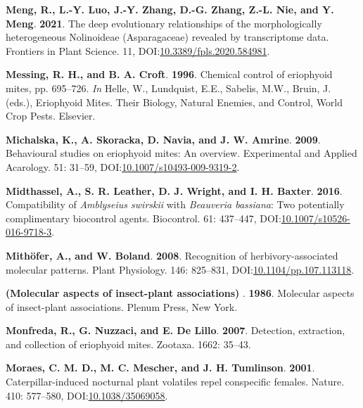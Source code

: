 \documentclass[12pt,final,CPage]{ufthesis}
\newlength{\cslhangindent}
\newenvironment{CSLReferences}[2] %
{%
	\setlength{\parindent}{0pt}
	\ifodd #1 \everypar{\setlength{\hangindent}{\cslhangindent}}\ignorespaces\fi
	\ifnum #2 > 0
	\setlength{\parskip}{#2\baselineskip}
	\fi
}%
{}
\begin{document}
{\begin{CSLReferences}{1}{0}
  \leavevmode{}%
  \textbf{Meng, R., L.-Y. Luo, J.-Y. Zhang, D.-G. Zhang, Z.-L. Nie, and Y. Meng}. \textbf{2021}. The deep evolutionary relationships of the morphologically heterogeneous {Nolinoideae} ({Asparagaceae}) revealed by transcriptome data. Frontiers in Plant Science. 11, DOI:\href{https://doi.org/10.3389/fpls.2020.584981}{10.3389/fpls.2020.584981}.

  \leavevmode{}%
  \textbf{Messing, R. H., and B. A. Croft}. \textbf{1996}. Chemical control of eriophyoid mites, pp. 695--726. \emph{In} Helle, W., Lundquist, E.E., Sabelis, M.W., Bruin, J. (eds.), Eriophyoid Mites. Their Biology, Natural Enemies, and Control, World Crop Pests. Elsevier.

  \leavevmode{}%
  \textbf{Michalska, K., A. Skoracka, D. Navia, and J. W. Amrine}. \textbf{2009}. Behavioural studies on eriophyoid mites: An overview. Experimental and Applied Acarology. 51: 31--59, DOI:\href{https://doi.org/10.1007/s10493-009-9319-2}{10.1007/s10493-009-9319-2}.

  \leavevmode{}%
  \textbf{Midthassel, A., S. R. Leather, D. J. Wright, and I. H. Baxter}. \textbf{2016}. Compatibility of {\emph{Amblyseius swirskii}} with {\emph{Beauveria bassiana}}: Two potentially complimentary biocontrol agents. Biocontrol. 61: 437--447, DOI:\href{https://doi.org/10.1007/s10526-016-9718-3}{10.1007/s10526-016-9718-3}.

  \leavevmode{}%
  \textbf{Mithöfer, A., and W. Boland}. \textbf{2008}. Recognition of herbivory-associated molecular patterns. Plant Physiology. 146: 825--831, DOI:\href{https://doi.org/10.1104/pp.107.113118}{10.1104/pp.107.113118}.

  \leavevmode{}%
  \textbf{(Molecular aspects of insect-plant associations) }. \textbf{1986}. Molecular aspects of insect-plant associations. Plenum Press, New York.

  \leavevmode{}%
  \textbf{Monfreda, R., G. Nuzzaci, and E. De Lillo}. \textbf{2007}. Detection, extraction, and collection of eriophyoid mites. Zootaxa. 1662: 35--43.

  \leavevmode{}%
  \textbf{Moraes, C. M. D., M. C. Mescher, and J. H. Tumlinson}. \textbf{2001}. Caterpillar-induced nocturnal plant volatiles repel conspecific females. Nature. 410: 577--580, DOI:\href{https://doi.org/10.1038/35069058}{10.1038/35069058}.


\end{CSLReferences}}
\end{document}

